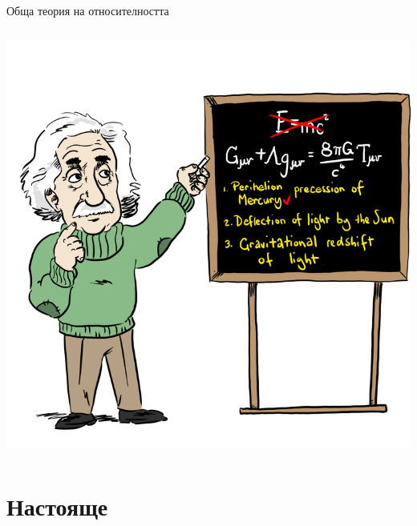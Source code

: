 \documentclass[10pt,a4paper]{beamer}
\begin{document}
        \begin{frame}{ Обща теория на относителността }
            \begin{columns}
                \begin{column}{0.5\textwidth}
                    \includegraphics[width=\textwidth]{images/einstein_gr.png}
                \end{column}
            \end{columns}
        \end{frame}
        
    \section{ Настояще }

        \begin{frame}{}
            \tableofcontents[currentsection]
        \end{frame}
        
\end{document}
